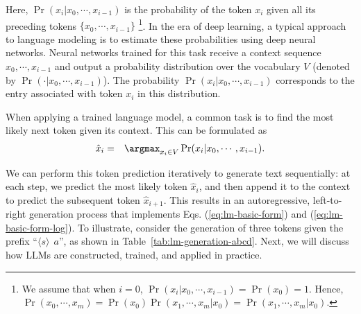 \noindent Here, $\Pr(x_{i}|x_0,\cdots,x_{i-1})$ is the probability of the token $x_i$ given all its preceding tokens $\{x_0,\cdots,\allowbreak x_{i-1}\}$ \footnote{We assume that when $i=0$, $\Pr(x_{i}|x_0,\cdots,x_{i-1})=\Pr(x_0)=1$. Hence, $\Pr(x_0,\cdots,x_m) = \Pr(x_0)\Pr(x_1,\cdots,x_m|x_0)=\Pr(x_1,\cdots,x_m|x_0)$.}. In the era of deep learning, a typical approach to language modeling is to estimate these probabilities using deep neural networks. Neural networks trained for this task receive a context sequence $x_0,\cdots,x_{i-1}$ and output a probability distribution over the vocabulary $V$ (denoted by $\Pr(\cdot|x_0,\cdots,x_{i-1})$). The probability $\Pr(x_{i}|x_0,\cdots,x_{i-1})$ corresponds to the entry associated with token $x_i$ in this distribution.

When applying a trained language model, a common task is to find the most likely next token given its context. This can be formulated as
\begin{eqnarray}
\hat{x}_i & = & \argmax_{x_i \in V} \Pr(x_{i}|x_0,\cdots,x_{i-1}).
\end{eqnarray}

We can perform this token prediction iteratively to generate text sequentially: at each step, we predict the most likely token $\hat{x}_i$, and then append it to the context to predict the subsequent token $\hat{x}_{i+1}$. This results in an autoregressive, left-to-right generation process that implements Eqs. (\ref{eq:lm-basic-form}) and (\ref{eq:lm-basic-form-log}). To illustrate, consider the generation of three tokens given the prefix ``$\langle s \rangle\ \ a$'', as shown in Table~\ref{tab:lm-generation-abcd}. Next, we will discuss how LLMs are constructed, trained, and applied in practice.

